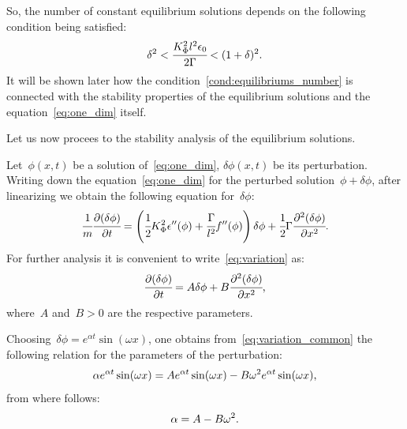 So, the number of constant equilibrium solutions depends on the following condition
being satisfied:
\begin{equation}
	\delta^2 < \cfrac{K_\Phi^2 l^2 \epsilon_0}{2 \Gamma} < (1 + \delta)^2 {\text{.}}
	\label{cond:equilibriums_number}
\end{equation}
It will be shown later how the
condition~\eqref{cond:equilibriums_number} is connected with the
stability properties of the equilibrium solutions and the
equation~\eqref{eq:one_dim} itself.

Let us now procees to the stability analysis of the equilibrium solutions.

Let~$\phi(x, t)$ be a solution of~\eqref{eq:one_dim}, $\delta \phi(x,
t)$ be its perturbation.
Writing down the equation~\eqref{eq:one_dim} for the perturbed solution~$\phi
+ \delta \phi$,
after linearizing we obtain the following equation for~$\delta\phi$:
\begin{equation}
  \cfrac{1}{m} \cfrac{\partial (\delta \phi)}{\partial t} = \left(\cfrac{1}{2} K_\Phi^2 \epsilon''(\phi) + \cfrac{\Gamma}{l^2} f''(\phi) \right) \delta \phi + \cfrac{1}{2} \Gamma \cfrac{\partial^2 (\delta \phi)}{\partial x^2} {\text{.}}
  \label{eq:variation}
\end{equation}
For further analysis it is convenient to write~\eqref{eq:variation} as:
%
\begin{equation}
  \cfrac{\partial (\delta \phi)}{\partial t} = A \delta \phi + B \cfrac{\partial^2 (\delta \phi)}{\partial x^2} {\text{,}}
  \label{eq:variation_common}
\end{equation}
where~$A$ and~$B  > 0$ are the respective parameters.

Choosing~$\delta \phi = e^{\alpha t} \sin(\omega x)$, one obtains from~\eqref{eq:variation_common}
the following relation for the parameters of the perturbation:
$$\alpha e^{\alpha t} \sin(\omega x) = A e^{\alpha t} \sin(\omega x) - B \omega^2 e^{\alpha t} \sin(\omega x) {\text{,}}$$
from where follows:
\begin{equation}
  \alpha = A - B \omega^2 {\text{.}}
  \label{eq:exponent_coefficient}
\end{equation}



